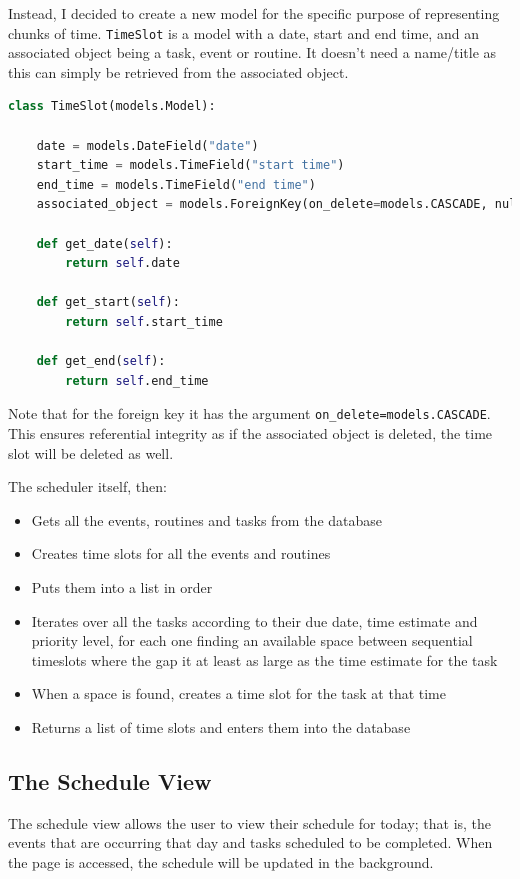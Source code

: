 \documentclass{article}
\begin{document}
Instead,
I decided to create a new model for the specific purpose of representing chunks of time.
\texttt{TimeSlot} is a model with a date, start and end time,
and an associated object being a task, event or routine.
It doesn't need a name/title as this can simply be retrieved from the associated object.

\begin{lstlisting}[language=Python, breaklines]
class TimeSlot(models.Model):

    date = models.DateField("date")
    start_time = models.TimeField("start time")
    end_time = models.TimeField("end time")
    associated_object = models.ForeignKey(on_delete=models.CASCADE, null=True)

    def get_date(self):
        return self.date

    def get_start(self):
        return self.start_time

    def get_end(self):
        return self.end_time
\end{lstlisting}

Note that for the foreign key it has the argument \texttt{on\_delete=models.CASCADE}.
This ensures referential integrity as if the associated object is deleted,
the time slot will be deleted as well.

The scheduler itself, then:
\begin{itemize}
	\item Gets all the events, routines and tasks from the database
	\item Creates time slots for all the events and routines
	\item Puts them into a list in order
	\item Iterates over all the tasks according to their due date, time estimate and priority level,
	      for each one finding an available space between sequential timeslots
	      where the gap it at least as large as the time estimate for the task
	\item When a space is found, creates a time slot for the task at that time
	\item Returns a list of time slots and enters them into the database
\end{itemize}

\subsection{The Schedule View}
The schedule view allows the user to view their schedule for today;
that is,
the events that are occurring that day and tasks scheduled to be completed.
When the page is accessed,
the schedule will be updated in the background.
\end{document}
